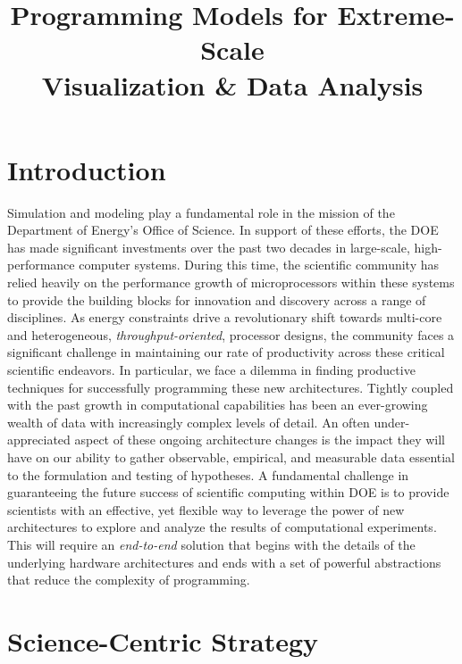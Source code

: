 \documentclass{tcvg}
\title{Programming Models for Extreme-Scale\\ 
         Visualization \& Data Analysis}
\newcommand{\backgroundpic}[1] {
	\ClearShipoutPicture
	\AddToShipoutPicture{
		\put(0,0) {
			\parbox[b][\paperheight]{\paperwidth}{
				\vfill
				\centering
				\texttt{[image: \#1]}
				\vfill
			}
		}
	}
}
\begin{document}
	
  \backgroundpic{figures/bg-front.pdf}

  \maketitle 

  \section*{Introduction}
   Simulation and modeling play a fundamental role in the mission of
   the Department of Energy's Office of Science.  In support of these
   efforts, the DOE has made significant investments over the past two
   decades in large-scale, high-performance computer systems.
   During this time, the scientific community has relied heavily on
   the performance growth of microprocessors within these systems to 
   provide the building blocks for innovation and discovery across a
   range of disciplines. As energy constraints drive a revolutionary 
   shift towards multi-core and heterogeneous, \emph{throughput-oriented},
   processor designs, the community faces a significant challenge in 
   maintaining our rate of productivity across these critical scientific 
   endeavors.  In particular, we face a dilemma in finding productive 
   techniques for successfully programming these new architectures. 
   Tightly coupled with the past growth in computational capabilities has 
   been an ever-growing wealth of data with increasingly complex levels of 
   detail.  An often under-appreciated aspect of these ongoing architecture
   changes is the impact they will have on our ability to gather
   observable, empirical, and measurable data essential to the formulation
   and testing of hypotheses.  A fundamental challenge in guaranteeing the
   future success of scientific computing within DOE is to provide 
   scientists with an effective, yet flexible way to leverage the power 
   of new architectures to explore and analyze the results of  
   computational experiments.  This will require an \emph{end-to-end} solution
   that begins with the details of the underlying hardware architectures and 
   ends with a set of powerful abstractions that reduce the complexity of 
   programming.
   
  \section*{Science-Centric Strategy}
\end{document}
